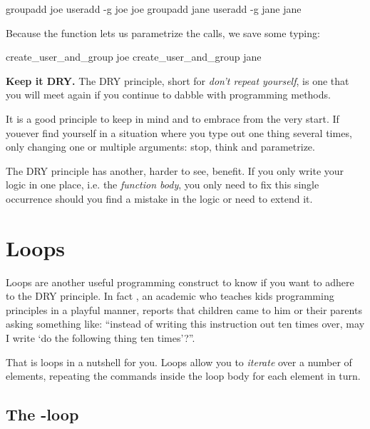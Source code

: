 \documentclass{olli-handout}
\begin{document}
\begin{lstbash}
groupadd joe
useradd -g joe joe
groupadd jane
useradd -g jane jane
\end{lstbash}

Because the function lets us parametrize the calls, we save some typing:

\begin{lstbash}
create_user_and_group joe
create_user_and_group jane
\end{lstbash}

\begin{hintbox}
    \textbf{Keep it DRY.} The DRY principle, short for \emph{don't repeat yourself}, is one that you will meet again if you continue to dabble with programming methods.

    It is a good principle to keep in mind and to embrace from the very start. If youever find yourself in a situation where you type out one thing several times, only changing one or multiple arguments: stop, think and parametrize.

    The DRY principle has another, harder to see, benefit. If you only write your logic in one place, i.e. the \emph{function body}, you only need to fix this single occurrence should you find a mistake in the logic or need to extend it.
\end{hintbox}

\section{Loops}

\begin{refmanbash}
\end{refmanbash}

Loops are another useful programming construct to know if you want to adhere to the DRY principle. In fact , an academic who teaches kids programming principles in a playful manner, reports that children came to him or their parents asking something like: ``instead of writing this instruction out ten times over, may I write `do the following thing ten times'?''.

That is loops in a nutshell for you. Loops allow you to \emph{iterate} over a number of elements, repeating the commands inside the loop body for each element in turn.

\subsection{The -loop}
\end{document}
